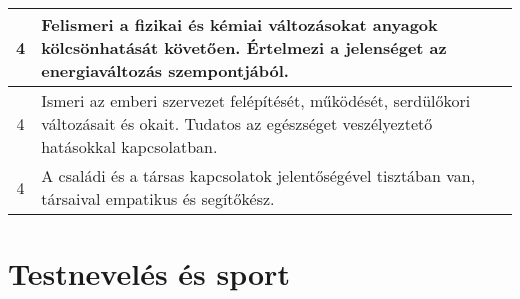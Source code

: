 \begin{longtable}{c | p{12cm} }
                                
                                          4 &  Felismeri a fizikai és kémiai változásokat anyagok kölcsönhatását követően. Értelmezi a jelenséget az energiaváltozás szempontjából. \\ \hline
                                          4 &  Ismeri az emberi szervezet felépítését, működését, serdülőkori változásait és okait. Tudatos az egészséget veszélyeztető hatásokkal kapcsolatban. \\ \hline
                                          4 &  A családi és a társas kapcsolatok jelentőségével tisztában van, társaival empatikus és segítőkész. \\ \hline
                                      
                        \end{longtable}
            \clearpage

        \section{Testnevelés és sport}

